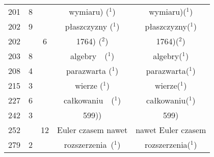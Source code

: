 \documentclass[a4paper,11pt]{article}
\begin{document}
\begin{center}
\begin{tabular}{|c|c|c|c|c|}
    201 &  8 & & wymiaru) ($^{ 1 }$) & wymiaru)($^{ 1 }$) \\
    202 &  9 & & płaszczyzny ($^{ 1 }$) & płaszczyzny($^{ 1 }$) \\
    202 & &  6 & 1764) ($^{ 2 }$) & 1764)($^{ 2 }$) \\
    203 &  8 & & algebry~~($^{ 1 }$) & algebry($^{ 1 }$) \\
    208 &  4 & & parazwarta ($^{ 1 }$) & parazwarta($^{ 1 }$) \\
    215 &  3 & & wierze ($^{ 1 }$) & wierze($^{ 1 }$) \\
    227 &  6 & & całkowaniu~~($^{ 1 }$) & całkowaniu($^{ 1 }$) \\
    242 &  3 & & 599)) & 599) \\
    252 & & 12 & Euler czasem nawet & nawet Euler czasem \\
    279 &  2 & & rozszerzenia~($^{ 1 }$) & rozszerzenia($^{ 1 }$) \\
    \hline
  \end{tabular}

\end{center}

\vspace{\spaceTwo}
\end{document}
